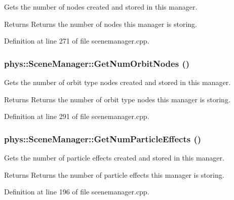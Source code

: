 Gets the number of nodes created and stored in this manager. 

\begin{DoxyReturn}{Returns}
Returns the number of nodes this manager is storing. 
\end{DoxyReturn}


Definition at line 271 of file scenemanager.cpp.

\hypertarget{classphys_1_1SceneManager_a5ad1eab41f98131cfdc359b5c2a73c72}{
\subsubsection[{GetNumOrbitNodes}]{ phys::SceneManager::GetNumOrbitNodes ()}}
\label{dd/da8/classphys_1_1SceneManager_a5ad1eab41f98131cfdc359b5c2a73c72}


Gets the number of orbit type nodes created and stored in this manager. 

\begin{DoxyReturn}{Returns}
Returns the number of orbit type nodes this manager is storing. 
\end{DoxyReturn}


Definition at line 291 of file scenemanager.cpp.

\hypertarget{classphys_1_1SceneManager_a1d3c320cf0578c2e09dc488f95ed88e2}{
\subsubsection[{GetNumParticleEffects}]{ phys::SceneManager::GetNumParticleEffects ()}}
\label{dd/da8/classphys_1_1SceneManager_a1d3c320cf0578c2e09dc488f95ed88e2}


Gets the number of particle effects created and stored in this manager. 

\begin{DoxyReturn}{Returns}
Returns the number of particle effects this manager is storing. 
\end{DoxyReturn}


Definition at line 196 of file scenemanager.cpp.

